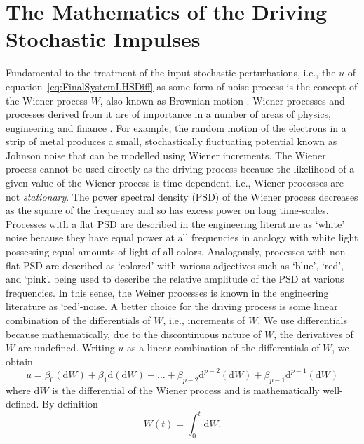 \documentclass[a4paper,fleqn,usenatbib]{mnras}
\begin{document}
\section[Stochastic Impulses Mathematics]{The Mathematics of the Driving Stochastic Impulses}\label{sec:RHS}

Fundamental to the treatment of the input stochastic perturbations, i.e., the $u$ of equation~\eqref{eq:FinalSystemLHSDiff} as some form of noise process is the concept of the Wiener process $W$, also known as Brownian motion \citep{Doob,Davis,Jacobs,Oksendal}. Wiener processes and processes derived from it are of importance in a number of areas of physics, engineering and finance \citep{Jacobs}. For example, the random motion of the electrons in a strip of metal produces a small, stochastically fluctuating potential known as Johnson noise \citep{Gillespie96} that can be modelled using Wiener increments. The Wiener process cannot be used directly as the driving process because the likelihood of a given value of the Wiener process is time-dependent, i.e., Wiener processes are not \textit{stationary}. The power spectral density (PSD) of the Wiener process decreases as the square of the frequency and so has excess power on long time-scales. Processes with a flat PSD are described in the engineering literature as `white' noise because they have equal power at all frequencies in analogy with white light possessing equal amounts of light of all colors. Analogously, processes with non-flat PSD are described as `colored' with various adjectives such as `blue', `red', and `pink'. being used to describe the relative amplitude of the PSD at various frequencies. In this sense, the Weiner processes is known in the engineering literature as `red'-noise. A better choice for the driving process is some linear combination of the differentials of $W$, i.e., increments of $W$. We use differentials because mathematically, due to the discontinuous nature of $W$, the derivatives of $W$ are undefined. Writing $u$ as a linear combination of the differentials of $W$, we obtain   
\begin{equation}\label{eq:FinalSystemRHSDiff}
u = \beta_{0} (\mathrm{d}W) + \beta_{1} \mathrm{d}(\mathrm{d}W) + \ldots + \beta_{p-2} \mathrm{d}^{p-2}(\mathrm{d}W) + \beta_{p-1} \mathrm{d}^{p-1}(\mathrm{d}W)
\end{equation}
where $\mathrm{d}W$ is the differential of the Wiener process and is mathematically well-defined. By definition
\begin{equation}\label{eq:WienerIncr}
W(t) = \int_{0}^{t} \mathrm{d}W.
\end{equation}
\end{document}
